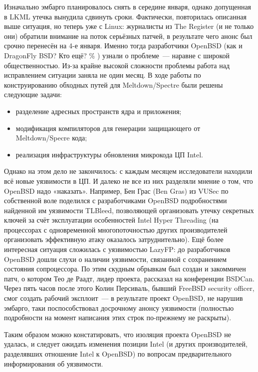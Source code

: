 \documentclass[10pt, a5paper]{article}
\begin{document}
Изначально эмбарго планировалось снять в середине января, однако допущенная в LKML утечка вынудила сдвинуть сроки. Фактически, повторилась описанная выше ситуация, но теперь уже с Linux: журналисты из The Register (и не только они) обратили внимание на поток серьёзных патчей, в результате чего анонс был срочно перенесён на 4-е января. Именно тогда разработчики OpenBSD (как и DragonFly BSD? Кто ещё? \% ) узнали о проблеме~--- наравне с широкой общественностью. Из-за крайне высокой сложности проблемы работа над исправлением ситуации заняла не один месяц. В ходе работы по конструированию обходных путей для Meltdown/Spectre были решены следующие задачи:

\begin{itemize}
  \item разделение адресных пространств ядра и приложения;
  \item модификация компиляторов для генерации защищающего от Meltdown/Specre кода;
  \item реализация инфраструктуры обновления микрокода ЦП Intel.
\end{itemize}

Однако на этом дело не закончилось: с каждым месяцем исследователи находили всё новые уязвимости в ЦП. И далеко не все из них разделяли мнение о том, что OpenBSD надо «наказать». Например, Бен Грас (Ben Gras) из VUSec по собственной воле поделился с разработчиками OpenBSD подробностями найденной им уязвимости TLBleed, позволяющей организовать утечку секретных ключей за счёт эксплуатации особенностей Intel Hyper Threading (на процессорах с одновременной многопоточностью других производителей организовать эффективную атаку оказалось затруднительно). Ещё более интересная ситуация сложилась с уязвимостью LazyFP: до разработчиков OpenBSD дошли слухи о наличии уязвимости, связанной с сохранением состояния сопроцессора. По этим скудным обрывкам был создан и закоммичен патч, о котором Тео де Раадт, лидер проекта, рассказал на конференции BSDCan. Через пять часов после этого Колин Персиваль, бывший FreeBSD security officer, смог создать рабочий эксплоит~--- в результате проект OpenBSD, не нарушив эмбарго, таки поспособствовал досрочному анонсу уязвимости (полностью подробности на момент написания этих строк по-прежнему не раскрыты).

Таким образом можно констатировать, что изоляция проекта OpenBSD не удалась, и следует ожидать изменения позиции Intel (и других производителей, разделявших отношение Intel к OpenBSD) по вопросам предварительного информирования об уязвимости.
\end{document}
